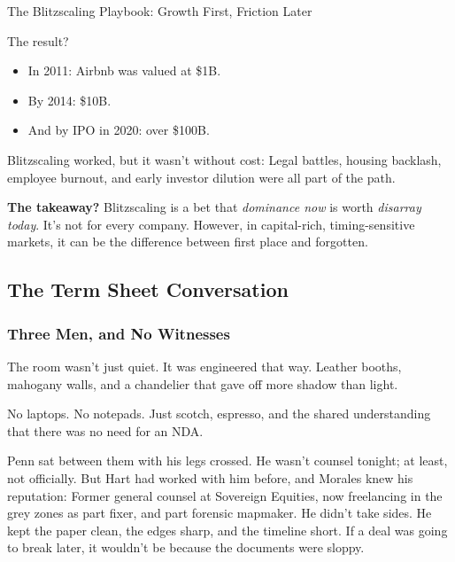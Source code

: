 \begin{HistoricalSidebar}{The Blitzscaling Playbook: Growth First, Friction Later}
  \medskip
  
  The result?

  \medskip
  
  \begin{itemize}
    \item In 2011: Airbnb was valued at \$1B.
    \item By 2014: \$10B.
    \item And by IPO in 2020: over \$100B.
  \end{itemize}
  
  \medskip
  
  Blitzscaling worked, but it wasn't without cost:  
  Legal battles, housing backlash, employee burnout, and early investor dilution were all part of the path.
  
  \medskip
  
  \textbf{The takeaway?}  
  Blitzscaling is a bet that \textit{dominance now} is worth \textit{disarray today}.  
  It’s not for every company. However, in capital-rich, timing-sensitive markets, it can be the difference between first place 
  and forgotten.
  
\end{HistoricalSidebar}



\subsection{The Term Sheet Conversation}

\subsubsection{Three Men, and No Witnesses}
The room wasn’t just quiet. It was engineered that way.
Leather booths, mahogany walls, and a chandelier that gave off more shadow than light.

No laptops. No notepads. Just scotch, espresso, and the shared understanding that there was 
no need for an NDA.

Penn sat between them with his legs crossed.
He wasn’t counsel tonight; at least, not officially.
But Hart had worked with him before, and Morales knew his reputation:
Former general counsel at Sovereign Equities, now freelancing in the grey zones as part fixer, and part 
forensic mapmaker.
He didn’t take sides. He kept the paper clean, the edges sharp, and the timeline short.
If a deal was going to break later, it wouldn’t be because the documents were sloppy.

